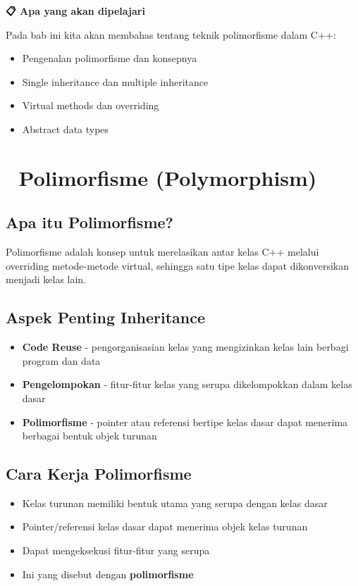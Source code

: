 \textbf{📋 Apa yang akan dipelajari}

Pada bab ini kita akan membahas tentang teknik polimorfisme dalam C++:

\begin{itemize}
\item Pengenalan polimorfisme dan konsepnya
\item Single inheritance dan multiple inheritance
\item Virtual methods dan overriding
\item Abstract data types
\end{itemize}

\minitoc

\section{🔄 Polimorfisme (Polymorphism)}\label{polymorphism}

\subsection{Apa itu Polimorfisme?}

Polimorfisme adalah konsep untuk merelasikan antar kelas C++ melalui overriding metode-metode virtual, sehingga satu tipe kelas dapat dikonversikan menjadi kelas lain.

\subsection{Aspek Penting Inheritance}

\begin{itemize}
\item \textbf{Code Reuse} - pengorganisasian kelas yang mengizinkan kelas lain berbagi program dan data
\item \textbf{Pengelompokan} - fitur-fitur kelas yang serupa dikelompokkan dalam kelas dasar
\item \textbf{Polimorfisme} - pointer atau referensi bertipe kelas dasar dapat menerima berbagai bentuk objek turunan
\end{itemize}

\subsection{Cara Kerja Polimorfisme}

\begin{itemize}
\item Kelas turunan memiliki bentuk utama yang serupa dengan kelas dasar
\item Pointer/referensi kelas dasar dapat menerima objek kelas turunan
\item Dapat mengeksekusi fitur-fitur yang serupa
\item Ini yang disebut dengan \textbf{polimorfisme}
\end{itemize}

